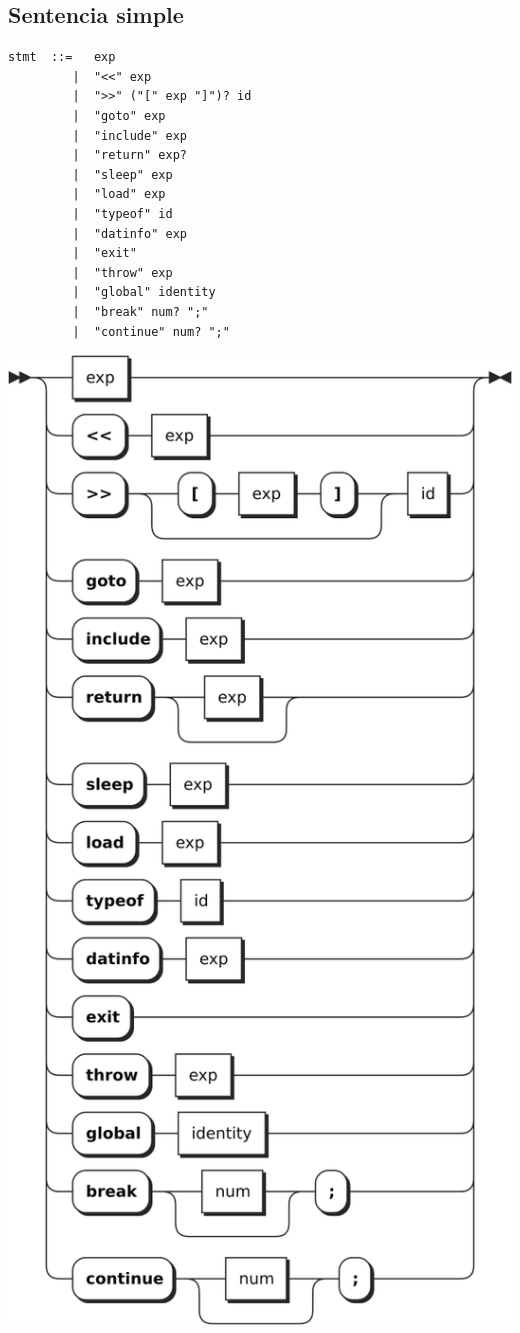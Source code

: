 \subsection{Sentencia simple}
\begin{multicols}{2}
\begin{lstlisting}[style=nonumbers]
stmt  ::=   exp
         |  "<<" exp
         |  ">>" ("[" exp "]")? id
         |  "goto" exp
         |  "include" exp
         |  "return" exp?
         |  "sleep" exp 
         |  "load" exp 
         |  "typeof" id 
         |  "datinfo" exp
         |  "exit"
         |  "throw" exp
         |  "global" identity
         |  "break" num? ";"
         |  "continue" num? ";"
\end{lstlisting}  	
\columnbreak
\begin{center}
\includegraphics[scale=0.6]{diagram/stmt.png} \\
\end{center}
\end{multicols}

